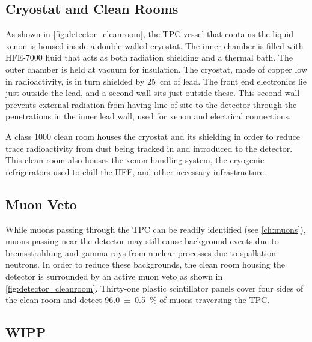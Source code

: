 \documentclass[herrin-thesis.tex]{subfiles}
\begin{document}
\subsection{Cryostat and Clean Rooms}
As shown in \cref{fig:detector_cleanroom}, the TPC vessel that contains the liquid xenon is housed inside a double-walled cryostat. The inner chamber is filled with HFE-7000 fluid that acts as both radiation shielding and a thermal bath. The outer chamber is held at vacuum for insulation. The cryostat, made of copper low in radioactivity, is in turn shielded by \SI{25}{\cm} of lead. The front end electronics lie just outside the lead, and a second wall sits just outside these. This second wall prevents external radiation from having line-of-site to the detector through the penetrations in the inner lead wall, used for xenon and electrical connections.

A class 1000 clean room houses the cryostat and its shielding in order to reduce trace radioactivity from dust being tracked in and introduced to the detector. This clean room also houses the xenon handling system, the cryogenic refrigerators used to chill the HFE, and other necessary infrastructure.

\subsection{Muon Veto}
While muons passing through the TPC can be readily identified (see \cref{ch:muons}), muons passing near the detector may still cause background events due to bremsstrahlung and gamma rays from nuclear processes due to spallation neutrons. In order to reduce these backgrounds, the clean room housing the detector is surrounded by an active muon veto as shown in \cref{fig:detector_cleanroom}. Thirty-one plastic scintillator panels cover four sides of the clean room and detect \SI{96.0\pm0.5}{\%} of muons traversing the TPC.

\subsection{WIPP}
\end{document}
